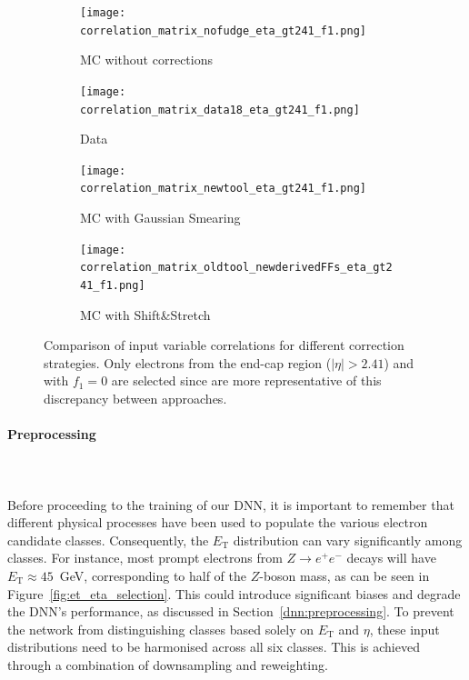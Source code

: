 \begin{figure}[htbp]
  \centering
  \begin{subfigure}[b]{0.49\textwidth}
      \centering
      \texttt{[image: correlation\_matrix\_nofudge\_eta\_gt241\_f1.png]}
      \caption{MC without corrections}
      \label{fig:corr_nominal}
  \end{subfigure}
  \hfill
  \begin{subfigure}[b]{0.49\textwidth}
      \centering
      \texttt{[image: correlation\_matrix\_data18\_eta\_gt241\_f1.png]}
      \caption{Data}
      \label{fig:corr_data}
  \end{subfigure}
  \vspace{0.4cm}
  \begin{subfigure}[b]{0.49\textwidth}
      \centering
      \texttt{[image: correlation\_matrix\_newtool\_eta\_gt241\_f1.png]}
      \caption{MC with Gaussian Smearing}
      \label{fig:corr_smearing}
  \end{subfigure}
  \hfill
  \begin{subfigure}[b]{0.49\textwidth}
      \centering
      \texttt{[image: correlation\_matrix\_oldtool\_newderivedFFs\_eta\_gt241\_f1.png]}
      \caption{MC with Shift\&Stretch}
      \label{fig:corr_shiftstretch}
  \end{subfigure}
  \caption{Comparison of input variable correlations for different correction strategies. Only electrons from the end-cap region ($|\eta|>2.41$) and with $f_{1}=0$ are selected since are more representative of this discrepancy between approaches.}
  \label{fig:correlations}
\end{figure}

\paragraph{Preprocessing} \mbox{}\\
\\
Before proceeding to the training of our DNN, it is important to remember that different physical processes have been used to populate the various electron candidate classes. Consequently, the $E_{\text{T}}$ distribution can vary significantly among classes. For instance, most prompt electrons from $Z \to e^{+}e^{-}$ decays will have $E_{\text{T}} \approx 45$~GeV, corresponding to half of the $Z$-boson mass, as can be seen in Figure~\ref{fig:et_eta_selection}. This could introduce significant biases and degrade the DNN’s performance, as discussed in Section~\ref{dnn:preprocessing}.
To prevent the network from distinguishing classes based solely on $E_{\text{T}}$ and $\eta$, these input distributions need to be harmonised across all six classes. This is achieved through a combination of downsampling and reweighting.

